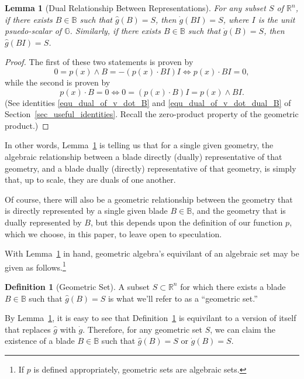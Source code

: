 \documentclass{birkjour}
\newtheorem{lem}[thm]{Lemma}
\theoremstyle{definition}
\newtheorem{defn}[thm]{Definition}
\theoremstyle{remark}
\numberwithin{equation}{section}
\newcommand{\R}{\mathbb{R}}
\newcommand{\B}{\mathbb{B}}
\newcommand{\G}{\mathbb{G}}
\newcommand{\gd}{\dot{g}}
\newcommand{\gh}{\hat{g}}
\begin{document}
\begin{lem}[Dual Relationship Between Representations]\label{lem_dual_rep}
For any subset $S$ of $\R^n$, if there exists $B\in\B$ such that $\gh(B)=S$, then $\gd(BI)=S$, where
$I$ is the unit psuedo-scalar of $\G$.  Similarly, if there exists $B\in\B$ such that $\gd(B)=S$, then $\gh(BI)=S$.
\end{lem}
\begin{proof}
The first of these two statements is proven by
\begin{equation*}
0=p(x)\wedge B=-(p(x)\cdot BI)I\iff p(x)\cdot BI=0,
\end{equation*}
while the second is proven by
\begin{equation*}
p(x)\cdot B=0\iff 0=(p(x)\cdot B)I=p(x)\wedge BI.
\end{equation*}
(See identities \eqref{equ_dual_of_v_dot_B} and \eqref{equ_dual_of_v_dot_dual_B} of Section~\ref{sec_useful_identities}.  Recall the zero-product property of the geometric product.)
\end{proof}

In other words, Lemma~\ref{lem_dual_rep} is telling us that for a single given geometry, the algebraic relationship between a
blade directly (dually) representative of that geometry, and a blade dually (directly) representative of that geometry, is simply
that, up to scale, they are duals of one another.

Of course, there will also be a geometric relationship between the geometry that is directly represented by a single given
blade $B\in\B$, and the geometry that is dually represented by $B$, but this depends upon the definition of our function
$p$, which we choose, in this paper, to leave open to speculation.

With Lemma~\ref{lem_dual_rep} in hand, geometric algebra's equivilant of an algebraic set may be given as follows.\footnote{If $p$ is
defined appropriately, geometric sets are algebraic sets.}

\begin{defn}[Geometric Set]\label{def_geo_set}
A subset $S\subset\R^n$ for which there exists a blade $B\in\B$ such that $\gh(B)=S$ is what we'll refer to as a ``geometric set.''
\end{defn}

By Lemma~\ref{lem_dual_rep}, it is easy to see that Definition~\ref{def_geo_set} is equivilant to a version of itself that replaces $\gh$ with $\gd$.
Therefore, for any geometric set $S$, we can claim the existence of a blade $B\in\B$ such that $\gh(B)=S$ or $\gd(B)=S$.
\end{document}

